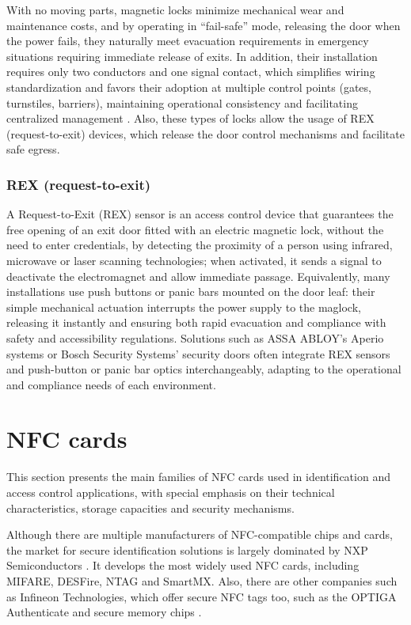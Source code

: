 With no moving parts, magnetic locks minimize mechanical wear and maintenance costs, and by operating in ``fail-safe'' mode, releasing the door when the power fails, they naturally meet evacuation requirements in emergency situations requiring immediate release of exits. In addition, their installation requires only two conductors and one signal contact, which simplifies wiring standardization and favors their adoption at multiple control points (gates, turnstiles, barriers), maintaining operational consistency and facilitating centralized management \cite{ref39}. Also, these types of locks allow the usage of REX (request-to-exit) devices, which release the door control mechanisms and facilitate safe egress.

\subsubsection{REX (request-to-exit)}

A Request-to-Exit (REX) sensor is an access control device that guarantees the free opening of an exit door fitted with an electric magnetic lock, without the need to enter credentials, by detecting the proximity of a person using infrared, microwave or laser scanning technologies; when activated, it sends a signal to deactivate the electromagnet and allow immediate passage. Equivalently, many installations use push buttons or panic bars mounted on the door leaf: their simple mechanical actuation interrupts the power supply to the maglock, releasing it instantly and ensuring both rapid evacuation and compliance with safety and accessibility regulations. Solutions such as ASSA ABLOY's Aperio systems \cite{ref40} or Bosch Security Systems' security doors \cite{ref41} often integrate REX sensors and push-button or panic bar optics interchangeably, adapting to the operational and compliance needs of each environment.


\section{NFC cards}

This section presents the main families of NFC cards used in identification and access control applications, with special emphasis on their technical characteristics, storage capacities and security mechanisms.

Although there are multiple manufacturers of NFC-compatible chips and cards, the market for secure identification solutions is largely dominated by NXP Semiconductors \cite{ref80}. It develops the most widely used NFC cards, including MIFARE, DESFire, NTAG and SmartMX. Also, there are other companies such as Infineon Technologies, which offer secure NFC tags too, such as the OPTIGA Authenticate and secure memory chips \cite{ref82}.

